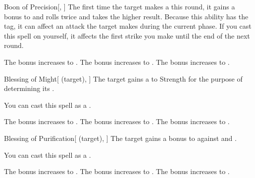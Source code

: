 \lowercase{\hypertarget{spell:Boon of Precision}{}}\label{spell:Boon of Precision}
\begin{freeability}[Rank 1]{\hypertarget{spell:Boon of Precision}{Boon of Precision}}[, ]
The first time the target makes a  this round,
it gains a  bonus to  and rolls twice and takes the higher result.
Because this ability has the  tag, it can affect an attack the target makes during the current phase.
If you cast this spell on yourself, it affects the first strike you make until the end of the next round.

\rankline
{} The bonus increases to .
 The bonus increases to .
 The bonus increases to .

\end{freeability}
\vspace{0.25em}



\lowercase{\hypertarget{spell:Blessing of Might}{}}\label{spell:Blessing of Might}
\begin{attuneability}[Rank 2]{\hypertarget{spell:Blessing of Might}{Blessing of Might}}[ (target), ]
The target gains a   to Strength for the purpose of determining its .

You can cast this spell as a .

\rankline
{} The bonus increases to .
 The bonus increases to .
 The bonus increases to .

\end{attuneability}
\vspace{0.25em}



\lowercase{\hypertarget{spell:Blessing of Purification}{}}\label{spell:Blessing of Purification}
\begin{attuneability}[Rank 2]{\hypertarget{spell:Blessing of Purification}{Blessing of Purification}}[ (target), ]
The target gains a  bonus to  against  and .

You can cast this spell as a .

\rankline
{} The bonus increases to .
 The bonus increases to .
 The bonus increases to .

\end{attuneability}
\vspace{0.25em}



